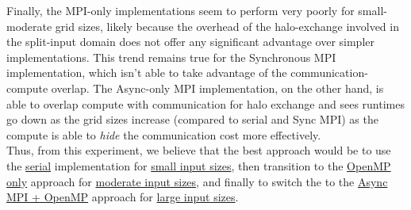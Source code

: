 \documentclass[a4paper,10pt]{article}
\begin{document}
Finally, the MPI-only implementations seem to perform very poorly for small-moderate grid sizes, likely because the overhead of the halo-exchange involved in the split-input domain does not offer any significant advantage over simpler implementations. This trend remains true for the Synchronous MPI implementation, which isn't able to take advantage of the communication-compute overlap. The Async-only MPI implementation, on the other hand, is able to overlap compute with communication for halo exchange and sees runtimes go down as the grid sizes increase (compared to serial and Sync MPI) as the compute is able to \textit{hide} the communication cost more effectively. \\

Thus, from this experiment, we believe that the best approach would be to use the \underline{serial} implementation for \underline{small input sizes}, then transition to the \underline{OpenMP only} approach for \underline{moderate input sizes}, and finally to switch the to the \underline{Async MPI + OpenMP} approach for \underline{large input sizes}. 


\end{document}
